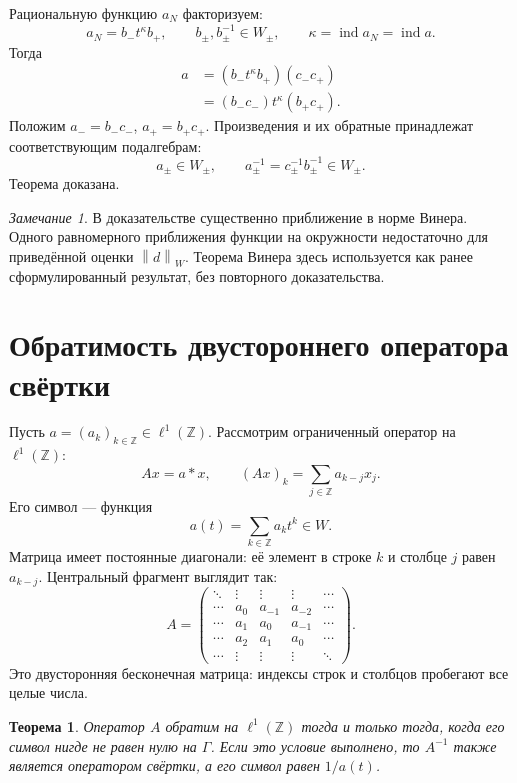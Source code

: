 \documentclass[12pt,a4paper]{article}
\newtheorem{theorem}{Теорема}
\theoremstyle{definition}
\theoremstyle{remark}
\newtheorem*{remark}{Замечание}
\newcommand{\ZZ}{\mathbb{Z}}
\newcommand{\norm}[1]{\left\lVert #1\right\rVert}
\DeclareMathOperator{\ind}{ind}
\begin{document}
Рациональную функцию $a_N$ факторизуем:
\[
  a_N=b_-t^\kappa b_+,\qquad
  b_\pm,b_\pm^{-1}\in W_\pm,\qquad
  \kappa=\ind a_N=\ind a.
\]
Тогда
\begin{align*}
  a&=(b_-t^\kappa b_+)(c_-c_+)\\
   &=(b_-c_-)t^\kappa(b_+c_+).
\end{align*}
Положим $a_-=b_-c_-$, $a_+=b_+c_+$. Произведения и их обратные
принадлежат соответствующим подалгебрам:
\[
  a_\pm\in W_\pm,\qquad
  a_\pm^{-1}=c_\pm^{-1}b_\pm^{-1}\in W_\pm.
\]
Теорема доказана.

\begin{remark}
В доказательстве существенно приближение в норме Винера. Одного
равномерного приближения функции на окружности недостаточно для
приведённой оценки $\norm{d}_W$. Теорема Винера здесь используется
как ранее сформулированный результат, без повторного доказательства.
\end{remark}

\section{Обратимость двустороннего оператора свёртки}

Пусть $a=(a_k)_{k\in\ZZ}\in\ell^1(\ZZ)$. Рассмотрим ограниченный
оператор на $\ell^1(\ZZ)$:
\[
  Ax=a*x,\qquad (Ax)_k=\sum_{j\in\ZZ}a_{k-j}x_j.
\]
Его символ --- функция
\[
  a(t)=\sum_{k\in\ZZ}a_kt^k\in W.
\]
Матрица имеет постоянные диагонали: её элемент в строке $k$
и столбце $j$ равен $a_{k-j}$. Центральный фрагмент выглядит так:
\[
  A=\begin{pmatrix}
    \ddots&\vdots&\vdots&\vdots&\cdots\\
    \cdots&a_0&a_{-1}&a_{-2}&\cdots\\
    \cdots&a_1&a_0&a_{-1}&\cdots\\
    \cdots&a_2&a_1&a_0&\cdots\\
    \cdots&\vdots&\vdots&\vdots&\ddots
  \end{pmatrix}.
\]
Это двусторонняя бесконечная матрица: индексы строк и столбцов
пробегают все целые числа.

\begin{theorem}
Оператор $A$ обратим на $\ell^1(\ZZ)$ тогда и только тогда, когда
его символ нигде не равен нулю на $\Gamma$.
Если это условие выполнено, то $A^{-1}$ также является оператором
свёртки, а его символ равен $1/a(t)$.
\end{theorem}
\end{document}
